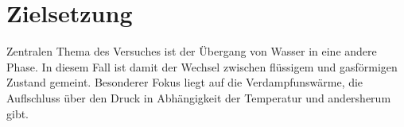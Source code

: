 \section{Zielsetzung}

Zentralen Thema des Versuches ist der Übergang von Wasser in eine andere Phase.
In diesem Fall ist damit der Wechsel zwischen flüssigem und gasförmigen Zustand gemeint.
Besonderer Fokus liegt auf die Verdampfunswärme, die Auflschluss über den Druck in Abhängigkeit
der Temperatur und andersherum gibt.
